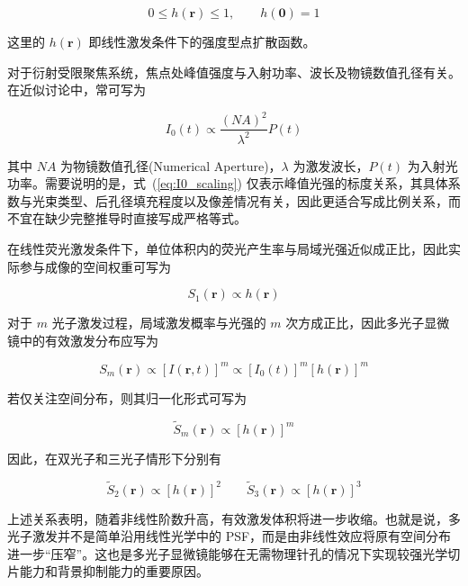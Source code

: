 \begin{equation}
  0\le h(\mathbf{r})\le 1,\qquad h(\mathbf{0})=1
\end{equation}

这里的 $h(\mathbf{r})$ 即线性激发条件下的强度型点扩散函数。

对于衍射受限聚焦系统，焦点处峰值强度与入射功率、波长及物镜数值孔径有关。在近似讨论中，常可写为

\begin{equation}
  I_{0}(t)\propto \frac{(NA)^2}{\lambda^2}P(t)
  \label{eq:I0_scaling}
\end{equation}

其中 $NA$ 为物镜数值孔径(Numerical Aperture)，$\lambda$ 为激发波长，$P(t)$ 为入射光功率。需要说明的是，式~(\ref{eq:I0_scaling}) 仅表示峰值光强的标度关系，其具体系数与光束类型、后孔径填充程度以及像差情况有关，因此更适合写成比例关系，而不宜在缺少完整推导时直接写成严格等式。

在线性荧光激发条件下，单位体积内的荧光产生率与局域光强近似成正比，因此实际参与成像的空间权重可写为

\begin{equation}
  S_{1}(\mathbf{r})\propto h(\mathbf{r})
  \label{eq:linear_psf}
\end{equation}

对于 $m$ 光子激发过程，局域激发概率与光强的 $m$ 次方成正比，因此多光子显微镜中的有效激发分布应写为

\begin{equation}
  S_{m}(\mathbf{r})\propto [I(\mathbf{r},t)]^{m}
  \propto [I_{0}(t)]^{m}[h(\mathbf{r})]^{m}
  \label{eq:multiphoton_psf}
\end{equation}

若仅关注空间分布，则其归一化形式可写为

\begin{equation}
  \widetilde{S}_{m}(\mathbf{r})\propto [h(\mathbf{r})]^{m}
  \label{eq:effective_psf}
\end{equation}

因此，在双光子和三光子情形下分别有

\begin{equation}
\widetilde{S}_{2}(\mathbf{r})\propto [h(\mathbf{r})]^2\qquad
\widetilde{S}_{3}(\mathbf{r})\propto [h(\mathbf{r})]^3
\end{equation}

上述关系表明，随着非线性阶数升高，有效激发体积将进一步收缩。也就是说，多光子激发并不是简单沿用线性光学中的 PSF，而是由非线性效应将原有空间分布进一步``压窄''。这也是多光子显微镜能够在无需物理针孔的情况下实现较强光学切片能力和背景抑制能力的重要原因。

